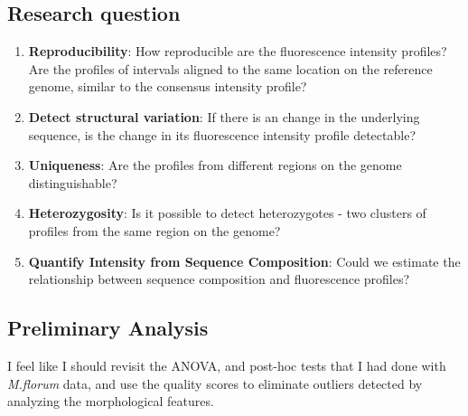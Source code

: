 \subsection*{Research question}
\begin{enumerate}
\item {\bf{Reproducibility}}: How reproducible are the fluorescence intensity profiles? Are the profiles of intervals aligned to the same location on the reference genome, similar to the consensus intensity profile?
\item {\bf{Detect structural variation}}: If there is an change in the underlying sequence, is the change in its fluorescence intensity profile detectable?
\item {\bf{Uniqueness}}: Are the profiles from different regions on the genome distinguishable? 
\item {\bf{Heterozygosity}}: Is it possible to detect heterozygotes - two clusters of profiles from the same region on the genome?
\item {\bf{Quantify Intensity from Sequence Composition}}: Could we estimate the relationship between sequence composition and fluorescence profiles?
\end{enumerate}

\subsection{Preliminary Analysis}
\begin{tcolorbox}[colback=red!5,colframe=red!40!black,title=Work in progress] %
I feel like I should revisit the ANOVA, and post-hoc tests that I had done with {\emph{M.florum}} data, and use the quality scores to eliminate outliers detected by analyzing the morphological features.
\end{tcolorbox}



